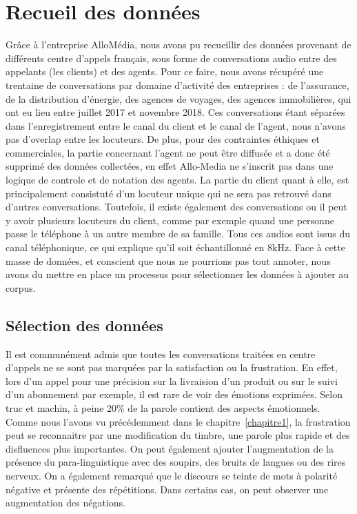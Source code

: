 \section{Recueil des données}
Grâce à l'entreprise AlloMédia, nous avons pu recueillir des données provenant de différents centre d'appels français, sous forme de conversations audio entre des appelants (les clients) et des agents.
Pour ce faire, nous avons récupéré une trentaine de conversations par domaine d'activité des entreprises : de l'assurance, de la distribution d'énergie, des agences de voyages, des agences immobilières, qui ont eu lieu entre juillet 2017 et novembre 2018. Ces conversations étant séparées dans l'enregistrement entre le canal du client et le canal de l'agent, nous n'avons pas d'overlap entre les locuteurs. De plus, pour des contraintes éthiques et commerciales, la partie concernant l'agent ne peut être diffusée et a donc été supprimé des données collectées, en effet Allo-Media ne s'inscrit pas dans une logique de controle et de notation des agents. La partie du client quant à elle, est principalement consistuté d'un locuteur unique qui ne sera pas retrouvé dans d'autres conversations. Toutefois, il existe également des conversations ou il peut y avoir plusieurs locuteurs du client, comme par exemple quand une personne passe le téléphone à un autre membre de sa famille. Tous ces audios sont issus du canal téléphonique, ce qui explique qu'il soit échantillonné en 8kHz.
Face à cette masse de données, et conscient que nous ne pourrions pas tout annoter, nous avons du mettre en place un processus pour sélectionner les données à ajouter au corpus.

\subsection{Sélection des données}
Il est communément admis que toutes les conversations traitées en centre d'appels ne se sont pas marquées par la satisfaction ou la frustration. En effet, lors d'un appel pour une précision sur la livraision d'un produit ou sur le suivi d'un abonnement par exemple, il est rare de voir des émotions exprimées. Selon truc et machin, à peine 20\% de la parole contient des aspects émotionnels.
Comme nous l'avons vu précédemment dans le chapitre~\ref{chapitre1}, la frustration peut se reconnaitre par une modification du timbre, une parole plus rapide et des disfluences plus importantes. On peut également ajouter l'augmentation de la présence du para-linguistique avec des soupirs, des bruits de langues ou des rires nerveux. On a également remarqué que le discours se teinte de mots à polarité négative et présente des répétitions. Dans certains cas, on peut observer une augmentation des négations.

